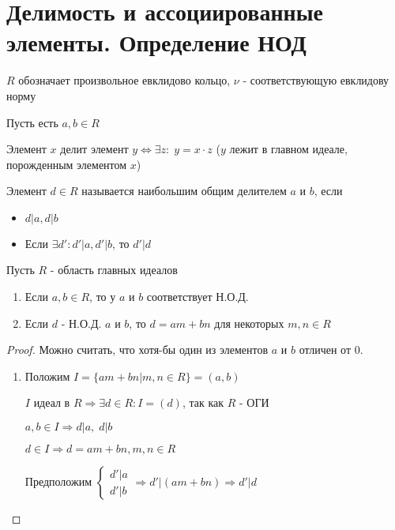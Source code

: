 \section{Делимость и ассоциированные элементы. Определение НОД}
\begin{normalsize}
    $R$ обозначает произвольное евклидово кольцо, $\nu$ - соответствующую евклидову норму
    \begin{theorem-non}
        Пусть есть $a, b \in R$
        \begin{conj}
            Элемент $x$ делит элемент $y \Longleftrightarrow \exists z: \; y = x \cdot z$ ($y$ лежит в главном идеале, порожденным элементом $x$)
        \end{conj}
        \begin{conj}
            Элемент $d \in R$ называется наибольшим общим делителем $a$ и $b$, если \begin{itemize}
                \item $d | a, d | b$
                \item Если $\exists d' : d' | a, d' | b$, то $d' | d$
            \end{itemize}
        \end{conj}
    \end{theorem-non}
    \begin{theorem-non}
        Пусть $R$ - область главных идеалов 

        \begin{enumerate}
            \item Если $a, b \in R$, то у $a$ и $b$ соответствует Н.О.Д.
            \item Если $d$ - Н.О.Д. $a$ и $b$, то $d = am + bn$ для некоторых $m, n \in R$
        \end{enumerate}
        \begin{proof}
            Можно считать, что хотя-бы один из элементов $a$ и $b$ отличен от $0$.
            \begin{enumerate}
                \item Положим $I = \{am + bn | m, n \in R\} = (a, b)$
                
                $I$ идеал в $R \Longrightarrow \exists d \in R : I = (d)$, так как $R$ - ОГИ  

                $a, b \in I \Longrightarrow d | a, \; d | b$

                $d \in I \Longrightarrow d = am + bn, m,n \in R$

                Предположим $\begin{cases}
                    d' | a \\
                    d' | b
                \end{cases} \Longrightarrow d' | (am + bn) \Longrightarrow d' | d$


\end{enumerate}
\end{proof}
\end{theorem-non}
\end{normalsize}
